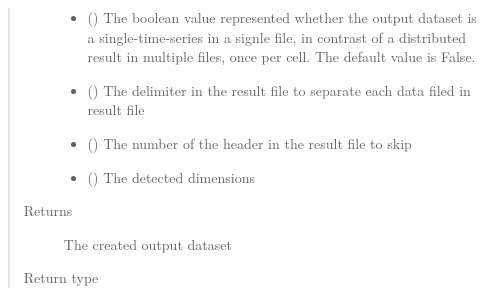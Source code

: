 \documentclass[letterpaper,10pt,english]{sphinxmanual}
\begin{document}
\begin{fulllineitems}
\begin{fulllineitems}
\begin{quote}
\begin{description}
\begin{itemize}
\item {} 
 () \textendash{} The boolean value represented whether the output dataset is a single-time-series in a signle file,        in contrast of a distributed result in multiple files, once per cell. The default value is False.

\item {} 
 () \textendash{} The delimiter in the result file to separate each data filed in result file

\item {} 
 () \textendash{} The number of the header in the result file to skip

\item {} 
 () \textendash{} The detected dimensions

\end{itemize}

\item[{Returns}] \leavevmode
The created output dataset

\item[{Return type}] \leavevmode
{}

\end{description}\end{quote}

\end{fulllineitems}



\end{fulllineitems}
\end{document}
